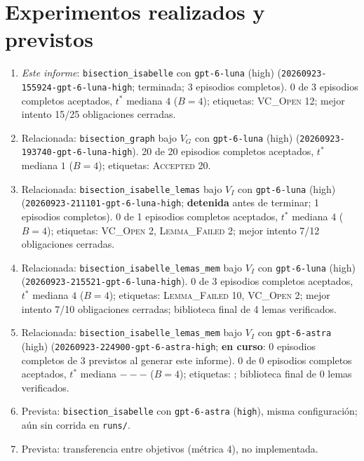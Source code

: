 \documentclass[11pt,a4paper]{article}
\begin{document}
\section{Experimentos realizados y previstos}

\begin{enumerate}
  \item \emph{Este informe}: \texttt{bisection\_\allowbreak{}isabelle} con \texttt{gpt-\allowbreak{}6-\allowbreak{}luna} (high) (\texttt{20260923-\allowbreak{}155924-\allowbreak{}gpt-\allowbreak{}6-\allowbreak{}luna-\allowbreak{}high}; terminada; 3 episodios completos). 0 de 3 episodios completos aceptados, $t^*$ mediana $4$ ($B = 4$); etiquetas: \textsc{VC\_Open} 12; mejor intento 15/25 obligaciones cerradas.
  \item Relacionada: \texttt{bisection\_\allowbreak{}graph} bajo $V_G$ con \texttt{gpt-\allowbreak{}6-\allowbreak{}luna} (high) (\texttt{20260923-\allowbreak{}193740-\allowbreak{}gpt-\allowbreak{}6-\allowbreak{}luna-\allowbreak{}high}). 20 de 20 episodios completos aceptados, $t^*$ mediana $1$ ($B = 4$); etiquetas: \textsc{Accepted} 20.
  \item Relacionada: \texttt{bisection\_\allowbreak{}isabelle\_\allowbreak{}lemas} bajo $V_I$ con \texttt{gpt-\allowbreak{}6-\allowbreak{}luna} (high) (\texttt{20260923-\allowbreak{}211101-\allowbreak{}gpt-\allowbreak{}6-\allowbreak{}luna-\allowbreak{}high}; \textbf{detenida} antes de terminar; 1 episodios completos). 0 de 1 episodios completos aceptados, $t^*$ mediana $4$ ($B = 4$); etiquetas: \textsc{VC\_Open} 2, \textsc{Lemma\_Failed} 2; mejor intento 7/12 obligaciones cerradas.
  \item Relacionada: \texttt{bisection\_\allowbreak{}isabelle\_\allowbreak{}lemas\_\allowbreak{}mem} bajo $V_I$ con \texttt{gpt-\allowbreak{}6-\allowbreak{}luna} (high) (\texttt{20260923-\allowbreak{}215521-\allowbreak{}gpt-\allowbreak{}6-\allowbreak{}luna-\allowbreak{}high}). 0 de 3 episodios completos aceptados, $t^*$ mediana $4$ ($B = 4$); etiquetas: \textsc{Lemma\_Failed} 10, \textsc{VC\_Open} 2; mejor intento 7/10 obligaciones cerradas; biblioteca final de 4 lemas verificados.
  \item Relacionada: \texttt{bisection\_\allowbreak{}isabelle\_\allowbreak{}lemas\_\allowbreak{}mem} bajo $V_I$ con \texttt{gpt-\allowbreak{}6-\allowbreak{}astra} (high) (\texttt{20260923-\allowbreak{}224900-\allowbreak{}gpt-\allowbreak{}6-\allowbreak{}astra-\allowbreak{}high}; \textbf{en curso}: 0 episodios completos de 3 previstos al generar este informe). 0 de 0 episodios completos aceptados, $t^*$ mediana $---$ ($B = 4$); etiquetas: ; biblioteca final de 0 lemas verificados.
  \item Prevista: \texttt{bisection\_\allowbreak{}isabelle} con \texttt{gpt-\allowbreak{}6-\allowbreak{}astra} (\texttt{high}), misma configuración; aún sin corrida en \texttt{runs/}.
  \item Prevista: transferencia entre objetivos (métrica 4), no implementada.
\end{enumerate}


\end{document}
